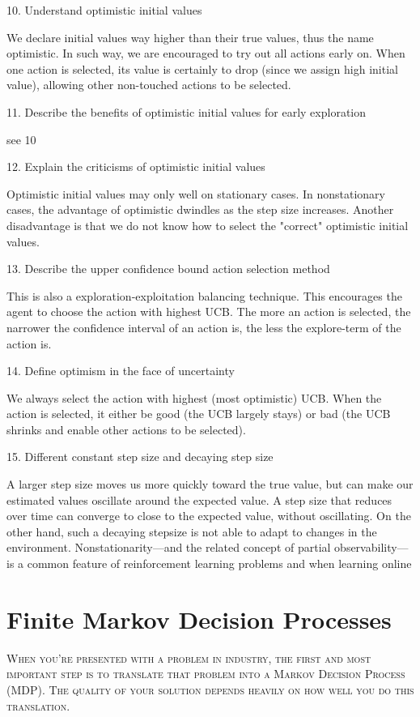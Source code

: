 \documentclass[lang=en,mode=geye,device=normal,color=blue,14pt]{elegantnote}
\newcommand{\mybox}[1]{\par\noindent\colorbox{shadecolor}
{\parbox{\dimexpr\textwidth-2\fboxsep\relax}{#1}}}
\DeclareMathOperator*{\1}{\mathbbm{1}}
\begin{document}
10. Understand optimistic initial values

We declare initial values way higher than their true values, thus the name optimistic. In such way, we are encouraged to try out all actions early on. When one action is selected, its value is certainly to drop (since we assign high initial value), allowing other non-touched actions to be selected.

11. Describe the benefits of optimistic initial values for early exploration

see 10

12. Explain the criticisms of optimistic initial values

Optimistic initial values may only well on stationary cases. In nonstationary cases, the advantage of optimistic dwindles as the step size increases.
Another disadvantage is that we do not know how to select the "correct" optimistic initial values.

13. Describe the upper confidence bound action selection method

This is also a exploration-exploitation balancing technique. This encourages the agent to choose the action with highest UCB. The more an action is selected, the narrower the confidence interval of an action is, the less the explore-term of the action is.

14. Define optimism in the face of uncertainty

We always select the action with highest (most optimistic) UCB. When the action is selected, it either be good (the UCB largely stays) or bad (the UCB shrinks and enable other actions to be selected).


15. Different constant step size and decaying step size

A larger step size moves us more quickly toward the true value, but can make our estimated values oscillate around the expected value. A step size that reduces over time can converge to close to the expected value, without oscillating. On the other hand, such a decaying stepsize is not able to adapt to changes in the environment. Nonstationarity---and the related concept of partial observability---is a common feature of reinforcement learning problems and when learning online

\newpage
\section{Finite Markov Decision Processes}

\mybox{\textsc{When you’re presented with a problem in industry, the first and most important step is to translate that problem into a Markov Decision Process (MDP). The quality of your solution depends heavily on how well you do this translation.}}
\end{document}
